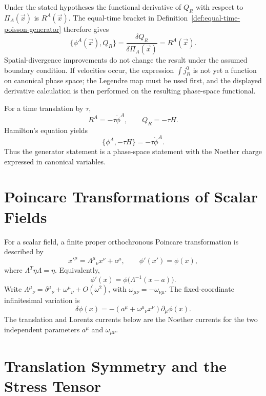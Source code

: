 Under the stated hypotheses the functional derivative of \(Q_R\) with respect
to \(\Pi_A(\vec x)\) is \(R^A(\vec x)\).  The equal-time bracket in
Definition~\ref{def:equal-time-poisson-generator} therefore gives
\[
  \{\phi^A(\vec x),Q_R\}
  =
  \frac{\delta Q_R}{\delta\Pi_A(\vec x)}
  =
  R^A(\vec x).
\]
Spatial-divergence improvements do not change the result under the assumed
boundary condition.  If velocities occur, the expression
\(\int j_R^0\) is not yet a function on canonical phase space; the Legendre
map must be used first, and the displayed derivative calculation is then
performed on the resulting phase-space functional.

\begin{example}
\label{ex:time-translation-noether-generator}
For a time translation by \(\tau\),
\[
  R^A=-\tau\dot\phi^A,\qquad Q_R=-\tau H.
\]
Hamilton's equation yields
\[
  \{\phi^A,-\tau H\}=-\tau\dot\phi^A .
\]
Thus the generator statement is a phase-space statement with the Noether
charge expressed in canonical variables.
\end{example}

\section{Poincare Transformations of Scalar Fields}

\begin{definition}
\label{def:scalar-poincare-transformation}
For a scalar field, a finite proper orthochronous Poincare transformation is
described by
\[
  x'^\mu=\Lambda^\mu{}_\nu x^\nu+a^\mu,\qquad
  \phi'(x')=\phi(x),
\]
where \(\Lambda^T\eta\Lambda=\eta\).  Equivalently,
\[
  \phi'(x)
  =
  \phi\big(\Lambda^{-1}(x-a)\big).
\]
Write
\(\Lambda^\mu{}_\nu=\delta^\mu{}_\nu+\omega^\mu{}_\nu+O(\omega^2)\), with
\(\omega_{\mu\nu}=-\omega_{\nu\mu}\).  The fixed-coordinate infinitesimal
variation is
\[
  \delta\phi(x)
  =
  -\left(a^\mu+\omega^\mu{}_\nu x^\nu\right)\partial_\mu\phi(x).
\]
The translation and Lorentz currents below are the Noether currents for the
two independent parameters \(a^\mu\) and \(\omega_{\mu\nu}\).
\end{definition}

\section{Translation Symmetry and the Stress Tensor}

